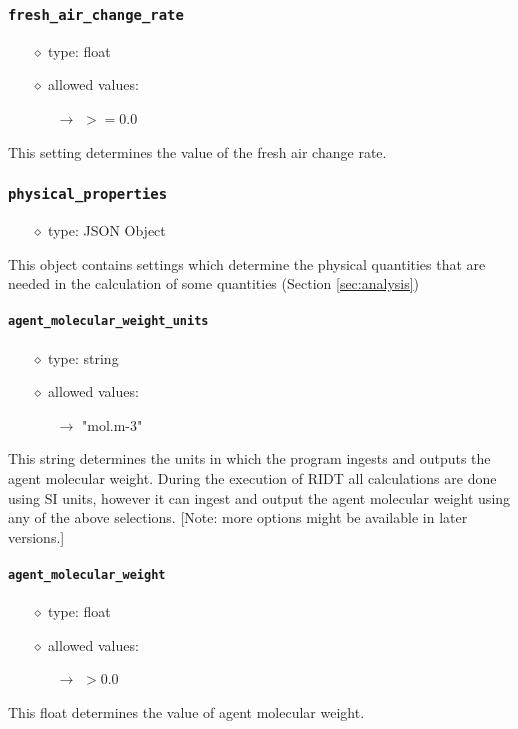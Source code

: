 \documentclass[]{article}
\def\code#1{\texttt{#1}}
\begin{document}
\subsubsection{\code{fresh\_air\_change\_rate}}\label{sec:freshairchangerate}
\begin{itemize}
    \item[$\diamond$] type: float 
    \item[$\diamond$] allowed values:
    \begin{itemize}
        \item[$\rightarrow$] $>=0.0$
    \end{itemize}
\end{itemize}
This setting determines the value of the fresh air change rate.

\subsubsection{\code{physical\_properties}}
\begin{itemize}
    \item[$\diamond$] type: JSON Object 
\end{itemize}
This object contains settings which determine the physical quantities that are
needed in the calculation of some quantities (Section \ref{sec:analysis})

\paragraph{\code{agent\_molecular\_weight\_units}}\label{sec:agentmolweightunits}
\begin{itemize}
    \item[$\diamond$] type: string 
    \item[$\diamond$] allowed values:
    \begin{itemize}
        \item[$\rightarrow$] "mol.m-3"
    \end{itemize}
\end{itemize}
This string determines the units in which the program ingests and outputs the
agent molecular weight. During the execution of RIDT all calculations are done
using SI units, however it can ingest and output the agent molecular weight
using any of the above selections. [Note: more options might be available in
later versions.]

\paragraph{\code{agent\_molecular\_weight}}\label{sec:agentmolweight}
\begin{itemize}
    \item[$\diamond$] type: float 
    \item[$\diamond$] allowed values:
    \begin{itemize}
        \item[$\rightarrow$] $>0.0$ 
    \end{itemize}
\end{itemize}
This float determines the value of agent molecular weight.
\end{document}
